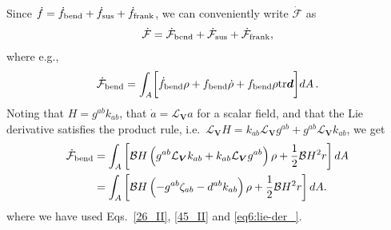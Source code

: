 Since $\dot{f}  =  \dot{f}_{\rm bend} +  \dot{f}_{\rm sus} + \dot{f}_{\rm frank}$, we can conveniently write $\dot{\mathcal{F}}$ as
\begin{align}   \label{40_II}
	\dot{\mathcal{F}} = \dot{\mathcal{F}}_{\rm bend} +   \dot{\mathcal{F}}_{\rm sus} +  \dot{\mathcal{F}}_{\rm frank},
\end{align}
where e.g.,
\begin{align}  \label{41_II}
	\dot{\mathcal{F}}_{\rm bend}  = {\int_A} \bigg [  \dot f_{\rm bend} \rho +  f_{\rm bend} \dot\rho +  f_{\rm bend} \rho  {\rm tr} \bm{d}   \bigg ] d A \,  .
\end{align}
Noting that $H=g^{ab}k_{ab}$, that $\dot{a}=\mathcal{L}_{\bm{V}} a$ for a scalar field, and that the Lie derivative satisfies the product rule, i.e.~$\mathcal{L}_{\bm{V}} H = k_{ab}\mathcal{L}_{\bm{V}}g^{ab}+g^{ab}\mathcal{L}_{\bm{V}}k_{ab}$, we get
\begin{equation}  \label{46_II}
	\begin{aligned}
		\dot{\mathcal{F}}_{\rm bend} &= {\int_A}  \left[\mathcal{B}H\left( g^{ab}\mathcal{L}_{\bm{V}}k_{ab} +  k_{ab} \mathcal{L}_{\bm{V}}  g^{ab}\right)\rho  + \frac{1}{2} \mathcal{B}H^2 r  \right]  d A \\
		&= {\int_A}  \left[\mathcal{B}H\left( -g^{ab}\zeta_{ab} -d^{ab} k_{ab}  \right)\rho+\frac{1}{2} \mathcal{B}H^2 r\right]  d A. 
	\end{aligned}
\end{equation}
where we have used Eqs.~\eqref{26_II}, \eqref{45_II} and \eqref{eq6:lie-der_}.


